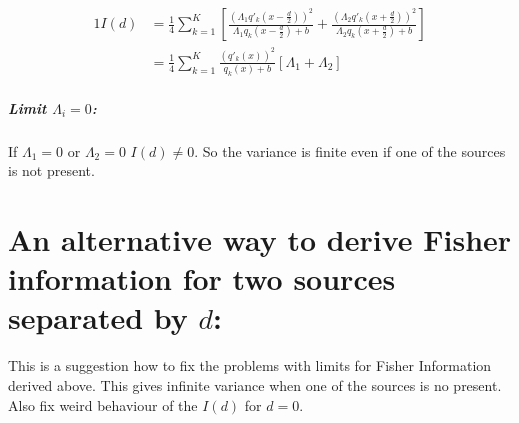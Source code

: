 \begin{alignat*}{1}
	I(d) 
	& =\frac{1}{4}\sum_{k=1}^K\left[\frac{\left(\Lambda_1q'_k(x-\frac{d}{2})\right)^2}{\Lambda_1q_k(x-\frac{d}{2})+b}+\frac{\left(\Lambda_2 q'_k(x+\frac{d}{2})\right)^2}{\Lambda_2q_k(x+\frac{d}{2})+b}\right]\\
 	& =\frac{1}{4}\sum_{k=1}^K\frac{\left(q'_k(x)\right)^2}{q_k(x)+b}\left[\Lambda_1+\Lambda_2\right]
\end{alignat*}

\subparagraph*{Limit $\Lambda_i=0$:}
If $\Lambda_1=0$ or $\Lambda_2=0$ $I(d)\neq0$. So the variance is finite even if one of the sources is not present.


\section{An alternative way to derive Fisher information for two sources separated by $d$:}
\label{sec:Appendix FI alternative}
This is a suggestion how to fix the problems with limits for Fisher Information derived above. This gives infinite variance when one of the sources is no present. Also fix weird behaviour of the $I(d)$ for $d=0$. 

